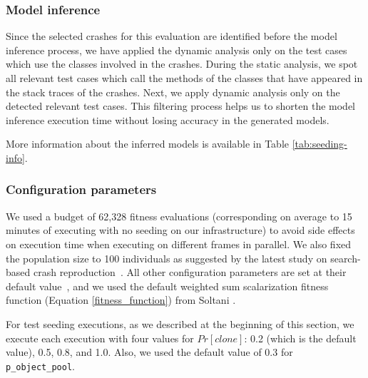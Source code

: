 \subsubsection{Model inference}
Since the selected crashes for this evaluation are identified before the model inference process, we have applied the dynamic analysis only on the test cases which use the classes involved in the crashes. During the static analysis, we spot all relevant test cases which call the methods of the classes that have appeared in the stack traces of the crashes. Next, we apply dynamic analysis only on the detected relevant test cases.
This filtering process helps us to shorten the model inference execution time without losing accuracy in the generated models.

More information about the inferred models is available in Table \ref{tab:seeding-info}.



\subsubsection{Configuration parameters}

We used a budget of 62,328 fitness evaluations (corresponding on average to 15 minutes of executing \botsing with no seeding on our infrastructure) to avoid side effects on execution time when executing \botsing on different frames in parallel.
We also fixed the population size to 100 individuals as suggested by the latest study on search-based crash reproduction~\cite{Soltani2018b}.
All other configuration parameters are set at their default value~\cite{Rojas2016}, and we used the default weighted sum scalarization fitness function (Equation \ref{fitness_function}) from Soltani \etal \cite{Soltani2018b}.

For test seeding executions, as we described at the beginning of this section, we execute each execution with four values for $Pr[clone]$: 0.2 (which is the default value), 0.5, 0.8, and 1.0. Also, we used the default value of 0.3 for \texttt{p\_object\_pool}.


